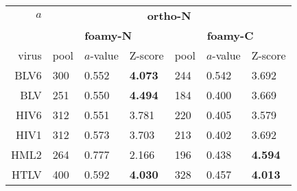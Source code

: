 \begin{table}
\centering
\begin{tabular}{r|lll|lll|}
$a$  & \multicolumn{6}{c|}{\bf ortho-N} \\
     & \multicolumn{3}{c|}{\bf foamy-N} & \multicolumn{3}{c|}{\bf foamy-C}  \\
\hline \hline
virus  & pool & $a$-value & Z-score & pool & $a$-value & Z-score \\
\hline
BLV6   &  300  & 0.552 & {\bf 4.073} &  244  & 0.542 &      3.692  \\
BLV    &  251  & 0.550 & {\bf 4.494} &  184  & 0.400 &      3.669  \\
HIV6   &  312  & 0.551 &      3.781  &  220  & 0.405 &      3.579  \\
HIV1   &  312  & 0.573 &      3.703  &  213  & 0.402 &      3.692  \\
HML2   &  264  & 0.777 &      2.166  &  196  & 0.438 & {\bf 4.594} \\
HTLV   &  400  & 0.592 & {\bf 4.030} &  328  & 0.457 & {\bf 4.013} \\

\end{tabular}
\end{table}
